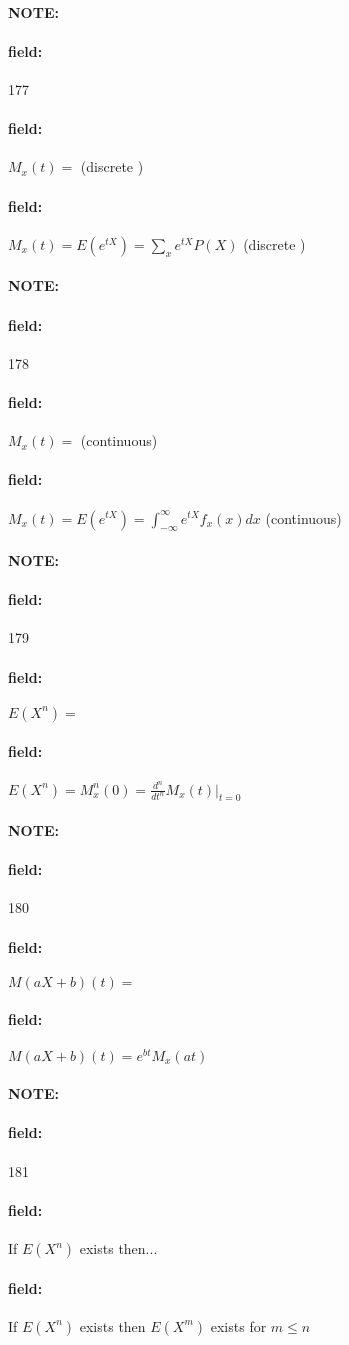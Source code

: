 \documentclass[12pt]{article}
\newenvironment{note}{\paragraph{NOTE:}}{}
\newenvironment{field}{\paragraph{field:}}{}
\begin{document}
\begin{note} \begin{field} \tiny 177 \end{field}
  \begin{field}
    $M_x(t) = $ (discrete )
  \end{field}
  \begin{field}
    $M_x(t) = E(e^{tX}) = \sum_x e^{tX}P(X)$ (discrete )
  \end{field}
\end{note}

\begin{note} \begin{field} \tiny 178 \end{field}
  \begin{field}
    $M_x(t) = $ (continuous)
  \end{field}
  \begin{field}
    $M_x(t) = E(e^{tX}) = \int_{-\infty}^\infty e^{tX}f_x(x)dx$ (continuous)
  \end{field}
\end{note}

\begin{note} \begin{field} \tiny 179 \end{field}
  \begin{field}
    $E(X^n) = $
  \end{field}
  \begin{field}
    $E(X^n) = M_x^n(0) = \frac{d^n}{dt^n}M_x(t)|_{t=0}$
  \end{field}
\end{note}

\begin{note} \begin{field} \tiny 180 \end{field}
  \begin{field}
    $M(aX + b)(t) = $
  \end{field}
  \begin{field}
    $M(aX + b)(t) = e^{bt}M_x(at)$
  \end{field}
\end{note}

\begin{note} \begin{field} \tiny 181 \end{field}
  \begin{field}
    If $E(X^n)$ exists then...
  \end{field}
  \begin{field}
    If $E(X^n)$ exists then $E(X^m)$ exists for $m \leq n$
  \end{field}
\end{note}
\end{document}
